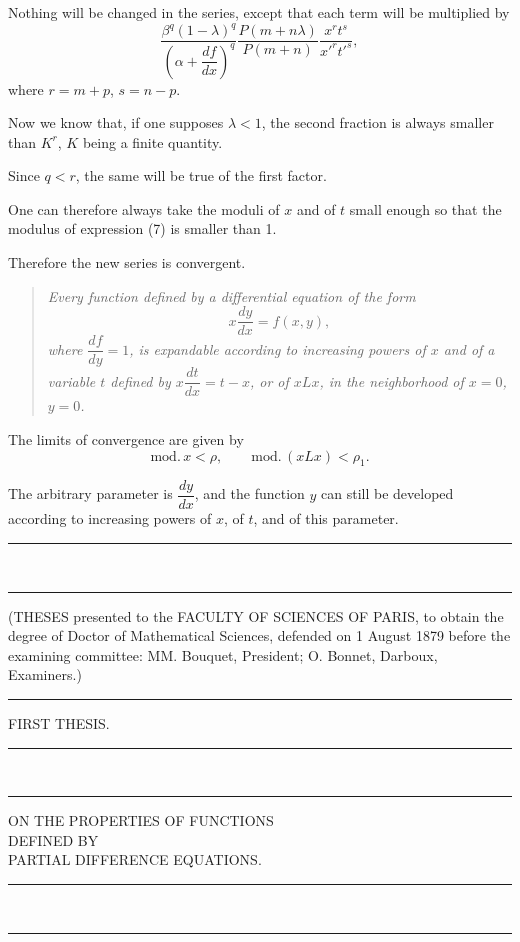 \documentclass[11pt]{article}
\newcommand{\ornament}{\begin{center}\rule{2.5em}{0.4pt}\,\raisebox{0.1ex}{\tiny$\bullet\bullet\bullet$}\,\rule{2.5em}{0.4pt}\end{center}}
\newcommand{\shortline}{\begin{center}\rule{3.5em}{0.4pt}\end{center}}
\begin{document}
Nothing will be changed in the series, except that each term will be multiplied by
\begin{equation*}\tag{7}
\frac{\beta^q(1-\lambda)^q}{\left(\alpha+\dfrac{df}{dx}\right)^q}\frac{P(m+n\lambda)}{P(m+n)}\frac{x^r t^s}{x'^r t'^s},
\end{equation*}
where $r=m+p$, $s=n-p$.

Now we know that, if one supposes $\lambda<1$, the second fraction is always smaller than $K^r$, $K$ being a finite quantity.

Since $q<r$, the same will be true of the first factor.

One can therefore always take the moduli of $x$ and of $t$ small enough so that the modulus of expression (7) is smaller than 1.

Therefore the new series is convergent.

\begin{quote}\itshape
Every function defined by a differential equation of the form
\[
x\frac{dy}{dx}=f(x,y),
\]
where $\dfrac{df}{dy}=1$, is expandable according to increasing powers of $x$ and of a variable $t$ defined by $x\dfrac{dt}{dx}=t-x$, or of $xLx$, in the neighborhood of $x=0$, $y=0$.
\end{quote}

The limits of convergence are given by
\[
\mathrm{mod}.\,x<\rho,
\qquad
\mathrm{mod}.\,(xLx)<\rho_1.
\]

The arbitrary parameter is $\dfrac{dy}{dx}$, and the function $y$ can still be developed according to increasing powers of $x$, of $t$, and of this parameter.

\ornament

\clearpage
\begin{center}
(THESES presented to the FACULTY OF SCIENCES OF PARIS, to obtain the degree of Doctor of Mathematical Sciences, defended on 1 August 1879 before the examining committee: MM. Bouquet, President; O. Bonnet, Darboux, Examiners.)
\end{center}
\shortline

\begin{center}
{\large FIRST THESIS.}
\end{center}
\ornament

\begin{center}
{\Large ON THE PROPERTIES OF FUNCTIONS}\\[0.5em]
{\small DEFINED BY}\\[0.5em]
{\large PARTIAL DIFFERENCE EQUATIONS.}
\end{center}
\ornament
\end{document}

